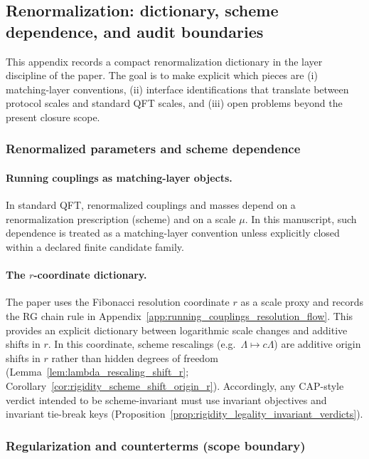 \subsection{Renormalization: dictionary, scheme dependence, and audit boundaries}
\label{app:renormalization_dictionary_and_boundaries}

This appendix records a compact renormalization dictionary in the layer discipline of the paper.
The goal is to make explicit which pieces are (i) matching-layer conventions, (ii) interface identifications that translate between protocol scales and standard QFT scales, and (iii) open problems beyond the present closure scope.

\subsubsection{Renormalized parameters and scheme dependence}
\paragraph{Running couplings as matching-layer objects.}
\MatchTag In standard QFT, renormalized couplings and masses depend on a renormalization prescription (scheme) and on a scale $\mu$.
In this manuscript, such dependence is treated as a matching-layer convention unless explicitly closed within a declared finite candidate family.

\paragraph{The $r$-coordinate dictionary.}
\InterfaceTag The paper uses the Fibonacci resolution coordinate $r$ as a scale proxy and records the RG chain rule in Appendix~\ref{app:running_couplings_resolution_flow}.
This provides an explicit dictionary between logarithmic scale changes and additive shifts in $r$.
\AuditTag In this coordinate, scheme rescalings (e.g.\ $\Lambda\mapsto c\Lambda$) are additive origin shifts in $r$ rather than hidden degrees of freedom (Lemma~\ref{lem:lambda_rescaling_shift_r}; Corollary~\ref{cor:rigidity_scheme_shift_origin_r}).
Accordingly, any CAP-style verdict intended to be scheme-invariant must use invariant objectives and invariant tie-break keys (Proposition~\ref{prop:rigidity_legality_invariant_verdicts}).

\subsubsection{Regularization and counterterms (scope boundary)}
